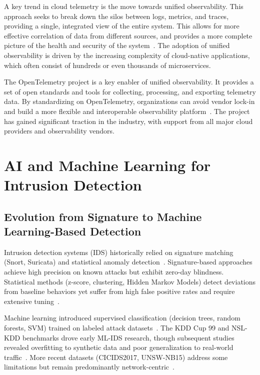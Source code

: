A key trend in cloud telemetry is the move towards unified observability. This approach seeks to break down the silos between logs, metrics, and traces, providing a single, integrated view of the entire system. This allows for more effective correlation of data from different sources, and provides a more complete picture of the health and security of the system~\cite{kloudmate2024observability}. The adoption of unified observability is driven by the increasing complexity of cloud-native applications, which often consist of hundreds or even thousands of microservices.

The OpenTelemetry project is a key enabler of unified observability. It provides a set of open standards and tools for collecting, processing, and exporting telemetry data. By standardizing on OpenTelemetry, organizations can avoid vendor lock-in and build a more flexible and interoperable observability platform~\cite{chronosphere2024opentelemetry}. The project has gained significant traction in the industry, with support from all major cloud providers and observability vendors.

\section{AI and Machine Learning for Intrusion Detection}\label{sec:lit-aiml}
\subsection{Evolution from Signature to Machine Learning-Based Detection}
Intrusion detection systems (IDS) historically relied on signature matching (Snort, Suricata) and statistical anomaly detection~\cite{chandola2009anomaly}. Signature-based approaches achieve high precision on known attacks but exhibit zero-day blindness. Statistical methods (z-score, clustering, Hidden Markov Models) detect deviations from baseline behaviors yet suffer from high false positive rates and require extensive tuning~\cite{garcia2009anomaly}.

Machine learning introduced supervised classification (decision trees, random forests, SVM) trained on labeled attack datasets~\cite{buczak2016survey}. The KDD Cup 99 and NSL-KDD benchmarks drove early ML-IDS research, though subsequent studies revealed overfitting to synthetic data and poor generalization to real-world traffic~\cite{tavallaee2009nslkdd}. More recent datasets (CICIDS2017, UNSW-NB15) address some limitations but remain predominantly network-centric~\cite{sharafaldin2018cicids}.

